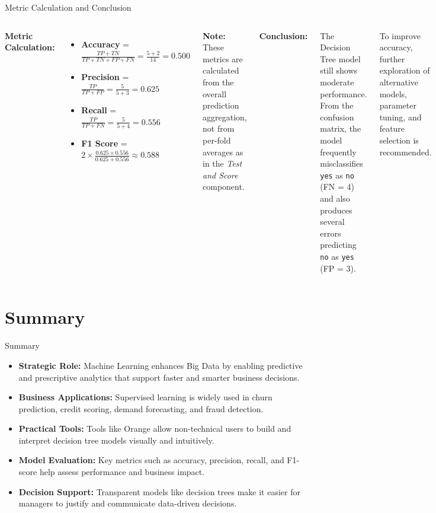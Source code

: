 \documentclass[aspectratio=169, table]{beamer}
\begin{document}
\begin{frame}{Metric Calculation and Conclusion}
	\vspace{20pt}
	\begin{columns}
		\textbf{Metric Calculation:}
		\vspace{5pt}
		\begin{itemize}
			\item \textbf{Accuracy} = \( \frac{TP + TN}{TP + TN + FP + FN} = \frac{5 + 2}{14} = 0.500 \)
			\item \textbf{Precision} = \( \frac{TP}{TP + FP} = \frac{5}{5 + 3} = 0.625 \)
			\item \textbf{Recall} = \( \frac{TP}{TP + FN} = \frac{5}{5 + 4} = 0.556 \)
			\item \textbf{F1 Score} = \( 2 \times \frac{0.625 \times 0.556}{0.625 + 0.556} \approx 0.588 \)
		\end{itemize}
		
		\textbf{Note:} These metrics are calculated from the overall prediction aggregation, not from per-fold averages as in the \textit{Test and Score} component.
		
		\vspace{5pt}
		\textbf{Conclusion:}
		
		The Decision Tree model still shows moderate performance. From the confusion matrix, the model frequently misclassifies \texttt{yes} as \texttt{no} (FN = 4) and also produces several errors predicting \texttt{no} as \texttt{yes} (FP = 3).
		
		To improve accuracy, further exploration of alternative models, parameter tuning, and feature selection is recommended.
	\end{columns}
\end{frame}

\section{Summary}

\begin{frame}{Summary}
	\vspace{20pt}
	\begin{itemize}
		\item \textbf{Strategic Role:} Machine Learning enhances Big Data by enabling predictive and prescriptive analytics that support faster and smarter business decisions.
		\item \textbf{Business Applications:} Supervised learning is widely used in churn prediction, credit scoring, demand forecasting, and fraud detection.
		\item \textbf{Practical Tools:} Tools like Orange allow non-technical users to build and interpret decision tree models visually and intuitively.
		\item \textbf{Model Evaluation:} Key metrics such as accuracy, precision, recall, and F1-score help assess performance and business impact.
		\item \textbf{Decision Support:} Transparent models like decision trees make it easier for managers to justify and communicate data-driven decisions.
	\end{itemize}
\end{frame}
\end{document}

